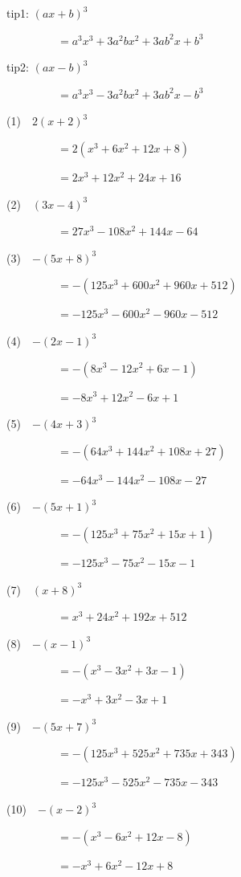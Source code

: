 \documentclass[a4j,twocolumn,10pt,fleqn]{jarticle}
\begin{document}
tip1: $\left(a x + b\right)^{3}$

~~~~~~~~~$=a^{3} x^{3} + 3 a^{2} b x^{2} + 3 a b^{2} x + b^{3}$


tip2: $\left(a x - b\right)^{3}$

~~~~~~~~~$=a^{3} x^{3} - 3 a^{2} b x^{2} + 3 a b^{2} x - b^{3}$


(1)~~$2\left(x + 2\right)^{3}$

~~~~~~~~~$=2(x^{3} + 6 x^{2} + 12 x + 8)$

~~~~~~~~~$=2 x^{3} + 12 x^{2} + 24 x + 16$

(2)~~$\left(3 x - 4\right)^{3}$

~~~~~~~~~$=27 x^{3} - 108 x^{2} + 144 x - 64$

(3)~~$-\left(5 x + 8\right)^{3}$

~~~~~~~~~$=-(125 x^{3} + 600 x^{2} + 960 x + 512)$

~~~~~~~~~$=- 125 x^{3} - 600 x^{2} - 960 x - 512$

(4)~~$-\left(2 x - 1\right)^{3}$

~~~~~~~~~$=-(8 x^{3} - 12 x^{2} + 6 x - 1)$

~~~~~~~~~$=- 8 x^{3} + 12 x^{2} - 6 x + 1$

(5)~~$-\left(4 x + 3\right)^{3}$

~~~~~~~~~$=-(64 x^{3} + 144 x^{2} + 108 x + 27)$

~~~~~~~~~$=- 64 x^{3} - 144 x^{2} - 108 x - 27$

(6)~~$-\left(5 x + 1\right)^{3}$

~~~~~~~~~$=-(125 x^{3} + 75 x^{2} + 15 x + 1)$

~~~~~~~~~$=- 125 x^{3} - 75 x^{2} - 15 x - 1$

(7)~~$\left(x + 8\right)^{3}$

~~~~~~~~~$=x^{3} + 24 x^{2} + 192 x + 512$

(8)~~$-\left(x - 1\right)^{3}$

~~~~~~~~~$=-(x^{3} - 3 x^{2} + 3 x - 1)$

~~~~~~~~~$=- x^{3} + 3 x^{2} - 3 x + 1$

(9)~~$-\left(5 x + 7\right)^{3}$

~~~~~~~~~$=-(125 x^{3} + 525 x^{2} + 735 x + 343)$

~~~~~~~~~$=- 125 x^{3} - 525 x^{2} - 735 x - 343$

(10)~~$-\left(x - 2\right)^{3}$

~~~~~~~~~$=-(x^{3} - 6 x^{2} + 12 x - 8)$

~~~~~~~~~$=- x^{3} + 6 x^{2} - 12 x + 8$
\end{document}
